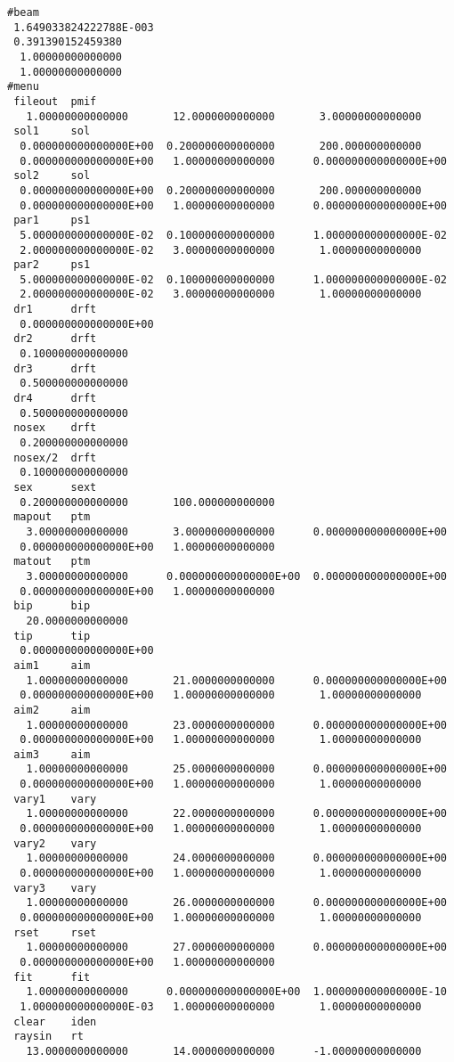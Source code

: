 \begin{footnotesize}
\begin{verbatim}
#beam
 1.649033824222788E-003
 0.391390152459380
  1.00000000000000
  1.00000000000000
#menu
 fileout  pmif
   1.00000000000000       12.0000000000000       3.00000000000000
 sol1     sol
  0.000000000000000E+00  0.200000000000000       200.000000000000
  0.000000000000000E+00   1.00000000000000      0.000000000000000E+00
 sol2     sol
  0.000000000000000E+00  0.200000000000000       200.000000000000
  0.000000000000000E+00   1.00000000000000      0.000000000000000E+00
 par1     ps1
  5.000000000000000E-02  0.100000000000000      1.000000000000000E-02
  2.000000000000000E-02   3.00000000000000       1.00000000000000
 par2     ps1
  5.000000000000000E-02  0.100000000000000      1.000000000000000E-02
  2.000000000000000E-02   3.00000000000000       1.00000000000000
 dr1      drft
  0.000000000000000E+00
 dr2      drft
  0.100000000000000
 dr3      drft
  0.500000000000000
 dr4      drft
  0.500000000000000
 nosex    drft
  0.200000000000000
 nosex/2  drft
  0.100000000000000
 sex      sext
  0.200000000000000       100.000000000000
 mapout   ptm
   3.00000000000000       3.00000000000000      0.000000000000000E+00
  0.000000000000000E+00   1.00000000000000
 matout   ptm
   3.00000000000000      0.000000000000000E+00  0.000000000000000E+00
  0.000000000000000E+00   1.00000000000000
 bip      bip
   20.0000000000000
 tip      tip
  0.000000000000000E+00
 aim1     aim
   1.00000000000000       21.0000000000000      0.000000000000000E+00
  0.000000000000000E+00   1.00000000000000       1.00000000000000
 aim2     aim
   1.00000000000000       23.0000000000000      0.000000000000000E+00
  0.000000000000000E+00   1.00000000000000       1.00000000000000
 aim3     aim
   1.00000000000000       25.0000000000000      0.000000000000000E+00
  0.000000000000000E+00   1.00000000000000       1.00000000000000
 vary1    vary
   1.00000000000000       22.0000000000000      0.000000000000000E+00
  0.000000000000000E+00   1.00000000000000       1.00000000000000
 vary2    vary
   1.00000000000000       24.0000000000000      0.000000000000000E+00
  0.000000000000000E+00   1.00000000000000       1.00000000000000
 vary3    vary
   1.00000000000000       26.0000000000000      0.000000000000000E+00
  0.000000000000000E+00   1.00000000000000       1.00000000000000
 rset     rset
   1.00000000000000       27.0000000000000      0.000000000000000E+00
  0.000000000000000E+00   1.00000000000000
 fit      fit
   1.00000000000000      0.000000000000000E+00  1.000000000000000E-10
  1.000000000000000E-03   1.00000000000000       1.00000000000000
 clear    iden
 raysin   rt
   13.0000000000000       14.0000000000000      -1.00000000000000

\end{verbatim}
\end{footnotesize}
